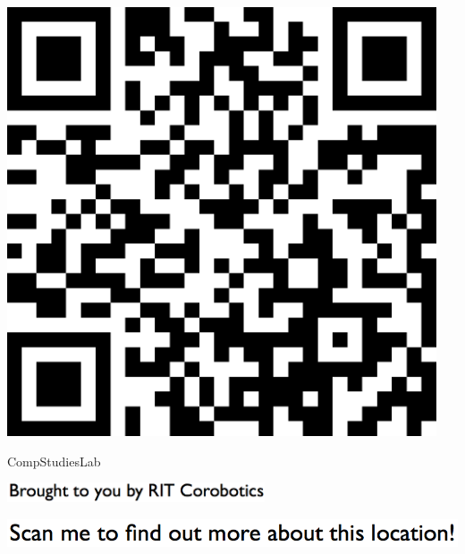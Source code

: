 \documentclass[letterpaper]{article}
\begin{document}
 \begingroup 
 \centerline{\includegraphics[scale=1,width=5in,height=5in]{CompStudiesLab.png}} 
 \endgroup 
 \vspace*{\fill} 

 \hfill{\small CompStudiesLab} 

  \vspace{0.7in} 
 
 \centerline{\includegraphics[scale=1,width=3in]{text-bottom.png}} 
 
 \pagebreak 
{} 
 \vspace*{\fill} 
 
  \centerline{\includegraphics[scale=1,width=6in]{text-top.png}} 
 
 \vspace{0.5in} 
 
\end{document}
